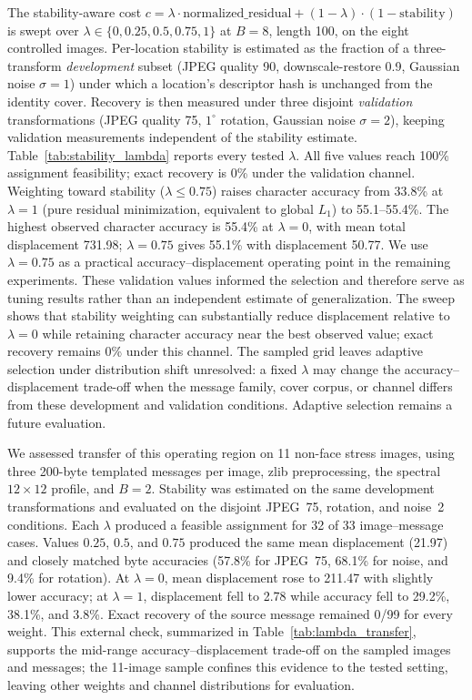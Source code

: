 \documentclass[preprint,12pt]{elsarticle}
\theoremstyle{plain}
\begin{document}
The stability-aware cost $c=\lambda\cdot\text{normalized\_residual}+(1-\lambda)\cdot(1-\text{stability})$
is swept over $\lambda\in\{0,0.25,0.5,0.75,1\}$ at $B=8$, length 100, on the
eight controlled images. Per-location stability is estimated as the fraction
of a three-transform \emph{development} subset (JPEG quality 90, downscale-restore
0.9, Gaussian noise $\sigma=1$) under which a location's descriptor hash is
unchanged from the identity cover. Recovery is then measured under three
disjoint \emph{validation} transformations (JPEG quality 75, $1^\circ$ rotation,
Gaussian noise $\sigma=2$), keeping validation measurements independent of
the stability estimate. Table~\ref{tab:stability_lambda} reports every tested
$\lambda$. All five values reach 100\% assignment feasibility; exact recovery
is 0\% under the validation channel. Weighting toward stability
($\lambda\leq0.75$) raises character accuracy from 33.8\% at $\lambda=1$
(pure residual minimization, equivalent to global $L_1$) to 55.1--55.4\%.
The highest observed character accuracy is 55.4\% at $\lambda=0$, with mean
total displacement 731.98; $\lambda=0.75$ gives 55.1\% with displacement
50.77. We use $\lambda=0.75$ as a practical accuracy--displacement operating
point in the remaining experiments. These validation values informed the
selection and therefore serve as tuning results rather than an independent
estimate of generalization. The sweep shows that stability weighting can
substantially reduce displacement relative to $\lambda=0$ while retaining
character accuracy near the best observed value; exact recovery remains 0\%
under this channel. The sampled grid leaves adaptive selection under
distribution shift unresolved: a fixed $\lambda$ may change the
accuracy--displacement trade-off when the message family, cover corpus, or
channel differs from these development and validation conditions. Adaptive
selection remains a future evaluation.

We assessed transfer of this operating region on 11 non-face stress images,
using three 200-byte templated messages per image, zlib preprocessing, the
spectral $12\times12$ profile, and $B=2$. Stability was estimated on the same
development transformations and evaluated on the disjoint JPEG~75, rotation,
and noise~2 conditions. Each $\lambda$ produced a feasible assignment for 32
of 33 image--message cases. Values $0.25$, $0.5$, and $0.75$ produced the same
mean displacement (21.97) and closely matched byte accuracies (57.8\% for
JPEG~75, 68.1\% for noise, and 9.4\% for rotation). At $\lambda=0$, mean
displacement rose to 211.47 with slightly lower accuracy; at $\lambda=1$,
displacement fell to 2.78 while accuracy fell to 29.2\%, 38.1\%, and 3.8\%.
Exact recovery of the source message remained 0/99 for every weight. This
external check, summarized in Table~\ref{tab:lambda_transfer}, supports the
mid-range accuracy--displacement trade-off on the sampled images and messages; the 11-image sample confines this evidence to the
tested setting, leaving other weights and channel distributions for evaluation.
\end{document}
